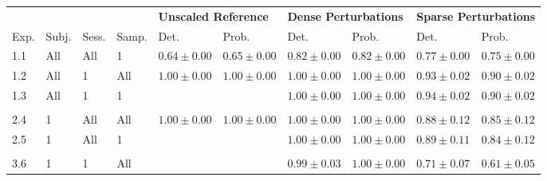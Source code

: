 
\begin{tabular}{llll|ll|ll|ll}
  &  &  &  &  \multicolumn{2}{l|}{\textbf{Unscaled Reference}} & \multicolumn{2}{l|}{\textbf{Dense Perturbations}} &  \multicolumn{2}{l}{\textbf{Sparse Perturbations}} \\
Exp. & Subj. & Sess. & Samp. & Det. &  Prob. &  Det. &    Prob. &     Det. &    Prob. \\
\hline
1.1        &          All &      All &          1 & \cellcolor{color1!10}$ 0.64 \pm 0.00 $ & \cellcolor{color1!10}$ 0.65 \pm 0.00 $  & \cellcolor{color1!10}$ 0.82 \pm 0.00 $ & \cellcolor{color1!10}$ 0.82 \pm 0.00 $ & \cellcolor{color1!10}$ 0.77 \pm 0.00 $ & \cellcolor{color1!10}$ 0.75 \pm 0.00 $ \\
1.2        &          All &        1 &        All &  $ 1.00 \pm 0.00 $ &  $ 1.00 \pm 0.00 $ &  $ 1.00 \pm 0.00 $ &  $ 1.00 \pm 0.00 $ &  $ 0.93 \pm 0.02 $ &  $ 0.90 \pm 0.02 $ \\
1.3        &          All &        1 &          1 &        &  &  $ 1.00 \pm 0.00 $ &  $ 1.00 \pm 0.00 $ &  $ 0.94 \pm 0.02 $ &  $ 0.90 \pm 0.02 $ \\
& & & & & & & & & \vspace{-5pt}\\
2.4        &            1 &      All &        All &  \cellcolor{color1!10}$ 1.00 \pm 0.00 $ &  \cellcolor{color1!10}$ 1.00 \pm 0.00 $  &  \cellcolor{color1!10}$ 1.00 \pm 0.00 $ &  \cellcolor{color1!10}$ 1.00 \pm 0.00 $ &  \cellcolor{color1!10}$ 0.88 \pm 0.12 $ &  \cellcolor{color1!10}$ 0.85 \pm 0.12 $ \\
2.5        &            1 &      All &          1 &        &  &  $ 1.00 \pm 0.00 $ &  $ 1.00 \pm 0.00 $ &  $ 0.89 \pm 0.11 $ &  $ 0.84 \pm 0.12 $ \\
& & & & & & & & & \vspace{-5pt}\\
3.6        &            1 &        1 &        All &         &  &  \cellcolor{color1!10}$ 0.99 \pm 0.03 $ &  \cellcolor{color1!10}$ 1.00 \pm 0.00 $ &  \cellcolor{color1!10}$ 0.71 \pm 0.07 $ &  \cellcolor{color1!10}$ 0.61 \pm 0.05 $ \\
\end{tabular}


